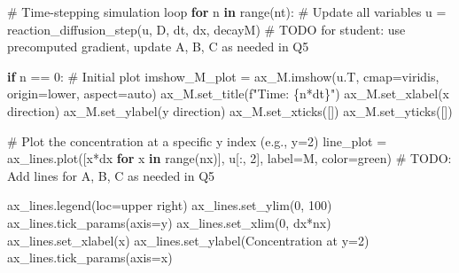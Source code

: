 \documentclass[
  letterpaper,
  DIV=11,
  numbers=noendperiod]{scrreprt}
\newenvironment{Shaded}{\begin{snugshade}}{\end{snugshade}}
\newcommand{\AlertTok}[1]{\textcolor[rgb]{0.68,0.00,0.00}{#1}}
\newcommand{\BuiltInTok}[1]{\textcolor[rgb]{0.00,0.23,0.31}{#1}}
\newcommand{\CommentTok}[1]{\textcolor[rgb]{0.37,0.37,0.37}{#1}}
\newcommand{\ControlFlowTok}[1]{\textcolor[rgb]{0.00,0.23,0.31}{\textbf{#1}}}
\newcommand{\DecValTok}[1]{\textcolor[rgb]{0.68,0.00,0.00}{#1}}
\newcommand{\KeywordTok}[1]{\textcolor[rgb]{0.00,0.23,0.31}{\textbf{#1}}}
\newcommand{\NormalTok}[1]{\textcolor[rgb]{0.00,0.23,0.31}{#1}}
\newcommand{\OperatorTok}[1]{\textcolor[rgb]{0.37,0.37,0.37}{#1}}
\newcommand{\SpecialCharTok}[1]{\textcolor[rgb]{0.37,0.37,0.37}{#1}}
\newcommand{\SpecialStringTok}[1]{\textcolor[rgb]{0.13,0.47,0.30}{#1}}
\newcommand{\StringTok}[1]{\textcolor[rgb]{0.13,0.47,0.30}{#1}}
\theoremstyle{definition}
\theoremstyle{remark}
\begin{document}
\begin{tcolorbox}
\begin{Shaded}
\begin{Highlighting}[]
\CommentTok{\# Time{-}stepping simulation loop}
\ControlFlowTok{for}\NormalTok{ n }\KeywordTok{in} \BuiltInTok{range}\NormalTok{(nt):}
    \CommentTok{\# Update all variables}
\NormalTok{    u }\OperatorTok{=}\NormalTok{ reaction\_diffusion\_step(u, D, dt, dx, decayM)}
    \CommentTok{\# }\AlertTok{TODO}\CommentTok{ for student: use precomputed gradient, update A, B, C as needed in Q5}
    
    \ControlFlowTok{if}\NormalTok{ n }\OperatorTok{==} \DecValTok{0}\NormalTok{:  }\CommentTok{\# Initial plot}
\NormalTok{        imshow\_M\_plot }\OperatorTok{=}\NormalTok{ ax\_M.imshow(u.T, cmap}\OperatorTok{=}\StringTok{\textquotesingle{}viridis\textquotesingle{}}\NormalTok{, origin}\OperatorTok{=}\StringTok{\textquotesingle{}lower\textquotesingle{}}\NormalTok{, aspect}\OperatorTok{=}\StringTok{\textquotesingle{}auto\textquotesingle{}}\NormalTok{)}
\NormalTok{        ax\_M.set\_title(}\SpecialStringTok{f"Time: }\SpecialCharTok{\{}\NormalTok{n}\OperatorTok{*}\NormalTok{dt}\SpecialCharTok{\}}\SpecialStringTok{"}\NormalTok{)}
\NormalTok{        ax\_M.set\_xlabel(}\StringTok{\textquotesingle{}x direction\textquotesingle{}}\NormalTok{)}
\NormalTok{        ax\_M.set\_ylabel(}\StringTok{\textquotesingle{}y direction\textquotesingle{}}\NormalTok{)}
\NormalTok{        ax\_M.set\_xticks([])}
\NormalTok{        ax\_M.set\_yticks([])}

        \CommentTok{\# Plot the concentration at a specific y index (e.g., y=2)    }
\NormalTok{        line\_plot }\OperatorTok{=}\NormalTok{ ax\_lines.plot([x}\OperatorTok{*}\NormalTok{dx }\ControlFlowTok{for}\NormalTok{ x }\KeywordTok{in} \BuiltInTok{range}\NormalTok{(nx)], u[:, }\DecValTok{2}\NormalTok{], label}\OperatorTok{=}\StringTok{\textquotesingle{}M\textquotesingle{}}\NormalTok{, color}\OperatorTok{=}\StringTok{\textquotesingle{}green\textquotesingle{}}\NormalTok{)}
        \CommentTok{\# }\AlertTok{TODO}\CommentTok{: Add lines for A, B, C as needed in Q5}

        
\NormalTok{        ax\_lines.legend(loc}\OperatorTok{=}\StringTok{\textquotesingle{}upper right\textquotesingle{}}\NormalTok{)}
\NormalTok{        ax\_lines.set\_ylim(}\DecValTok{0}\NormalTok{, }\DecValTok{100}\NormalTok{)}
\NormalTok{        ax\_lines.tick\_params(axis}\OperatorTok{=}\StringTok{\textquotesingle{}y\textquotesingle{}}\NormalTok{)}
\NormalTok{        ax\_lines.set\_xlim(}\DecValTok{0}\NormalTok{, dx}\OperatorTok{*}\NormalTok{nx)}
\NormalTok{        ax\_lines.set\_xlabel(}\StringTok{\textquotesingle{}x\textquotesingle{}}\NormalTok{)}
\NormalTok{        ax\_lines.set\_ylabel(}\StringTok{\textquotesingle{}Concentration at y=2\textquotesingle{}}\NormalTok{)}
\NormalTok{        ax\_lines.tick\_params(axis}\OperatorTok{=}\StringTok{\textquotesingle{}x\textquotesingle{}}\NormalTok{)}


\end{Highlighting}
\end{Shaded}
\end{tcolorbox}
\end{document}
